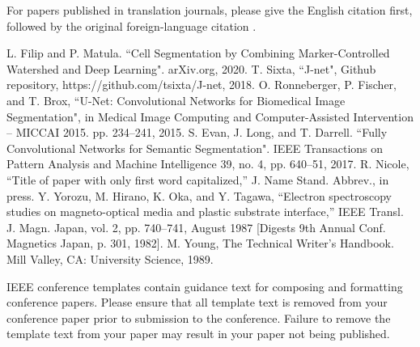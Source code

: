 \documentclass[conference]{IEEEtran}
\begin{document}
For papers published in translation journals, please give the English 
citation first, followed by the original foreign-language citation \cite{b6}.

\begin{thebibliography}{00}
 L. Filip and P. Matula. ``Cell Segmentation by Combining Marker-Controlled Watershed and Deep Learning". arXiv.org, 2020.
 T. Sixta, ``J-net", Github repository, https://github.com/tsixta/J-net, 2018.
 O. Ronneberger, P. Fischer, and T. Brox, ``U-Net: Convolutional Networks for Biomedical Image Segmentation", in Medical Image Computing and Computer-Assisted Intervention – MICCAI 2015. pp. 234–241, 2015.
 S. Evan, J. Long, and T. Darrell. ``Fully Convolutional Networks for Semantic Segmentation". IEEE Transactions on Pattern Analysis and Machine Intelligence 39, no. 4, pp. 640–51, 2017. 
 R. Nicole, ``Title of paper with only first word capitalized,'' J. Name Stand. Abbrev., in press.
 Y. Yorozu, M. Hirano, K. Oka, and Y. Tagawa, ``Electron spectroscopy studies on magneto-optical media and plastic substrate interface,'' IEEE Transl. J. Magn. Japan, vol. 2, pp. 740--741, August 1987 [Digests 9th Annual Conf. Magnetics Japan, p. 301, 1982].
 M. Young, The Technical Writer's Handbook. Mill Valley, CA: University Science, 1989.
\end{thebibliography}
\vspace{12pt}
\color{red}
IEEE conference templates contain guidance text for composing and formatting conference papers. Please ensure that all template text is removed from your conference paper prior to submission to the conference. Failure to remove the template text from your paper may result in your paper not being published.
\end{document}
